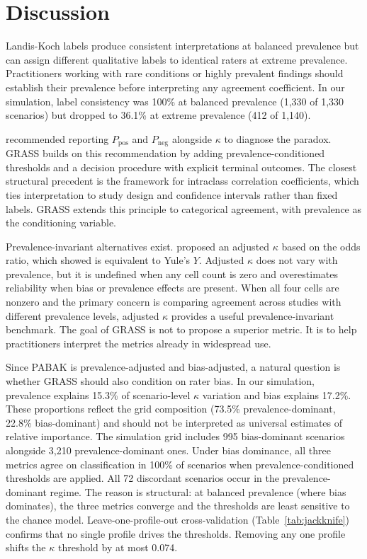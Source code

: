 \documentclass[11pt]{article}
\begin{document}
\section*{Discussion}

Landis-Koch labels produce consistent interpretations at balanced prevalence but can assign different qualitative labels to identical raters at extreme prevalence. Practitioners working with rare conditions or highly prevalent findings should establish their prevalence before interpreting any agreement coefficient. In our simulation, label consistency was 100\% at balanced prevalence (1,330 of 1,330 scenarios) but dropped to 36.1\% at extreme prevalence (412 of 1,140).

\citet{cicchetti1990high} recommended reporting $P_{\text{pos}}$ and $P_{\text{neg}}$ alongside $\kappa$ to diagnose the paradox. GRASS builds on this recommendation by adding prevalence-conditioned thresholds and a decision procedure with explicit terminal outcomes. The closest structural precedent is the \citet{koo2016guideline} framework for intraclass correlation coefficients, which ties interpretation to study design and confidence intervals rather than fixed labels. GRASS extends this principle to categorical agreement, with prevalence as the conditioning variable.

Prevalence-invariant alternatives exist. \citet{hoehler2000bias} proposed an adjusted $\kappa$ based on the odds ratio, which \citet{walter2001hoehler} showed is equivalent to Yule's $Y$. Adjusted $\kappa$ does not vary with prevalence, but it is undefined when any cell count is zero and overestimates reliability when bias or prevalence effects are present. When all four cells are nonzero and the primary concern is comparing agreement across studies with different prevalence levels, adjusted $\kappa$ provides a useful prevalence-invariant benchmark. The goal of GRASS is not to propose a superior metric. It is to help practitioners interpret the metrics already in widespread use.

Since PABAK is prevalence-adjusted and bias-adjusted, a natural question is whether GRASS should also condition on rater bias. In our simulation, prevalence explains 15.3\% of scenario-level $\kappa$ variation and bias explains 17.2\%. These proportions reflect the grid composition (73.5\% prevalence-dominant, 22.8\% bias-dominant) and should not be interpreted as universal estimates of relative importance. The simulation grid includes 995 bias-dominant scenarios alongside 3,210 prevalence-dominant ones. Under bias dominance, all three metrics agree on classification in 100\% of scenarios when prevalence-conditioned thresholds are applied. All 72 discordant scenarios occur in the prevalence-dominant regime. The reason is structural: at balanced prevalence (where bias dominates), the three metrics converge and the thresholds are least sensitive to the chance model. Leave-one-profile-out cross-validation (Table~\ref{tab:jackknife}) confirms that no single profile drives the thresholds. Removing any one profile shifts the $\kappa$ threshold by at most 0.074.
\end{document}
